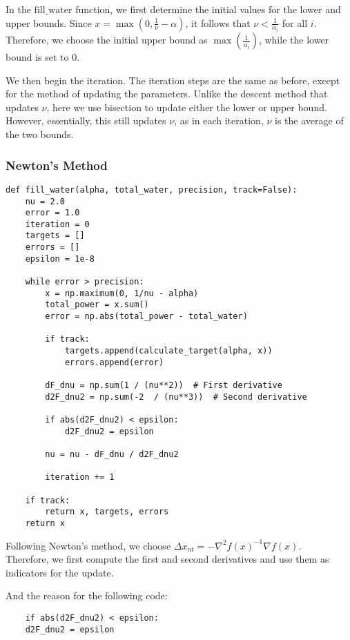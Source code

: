 \documentclass[a4paper,12pt]{article}
\begin{document}
In the \( \text{fill\_water} \) function, we first determine the initial values for the lower and upper bounds. Since \( x = \max(0, \frac{1}{\nu} - \alpha) \), it follows that \( \nu < \frac{1}{\alpha_i} \) for all \( i \). Therefore, we choose the initial upper bound as \( \max\left(\frac{1}{\alpha_i}\right) \), while the lower bound is set to 0.

We then begin the iteration. The iteration steps are the same as before, except for the method of updating the parameters. Unlike the descent method that updates \( \nu \), here we use bisection to update either the lower or upper bound. However, essentially, this still updates \( \nu \), as in each iteration, \( \nu \) is the average of the two bounds.
    \subsubsection{Newton's Method}
\begin{lstlisting}
def fill_water(alpha, total_water, precision, track=False):
    nu = 2.0
    error = 1.0
    iteration = 0
    targets = []
    errors = []
    epsilon = 1e-8
    
    while error > precision:
        x = np.maximum(0, 1/nu - alpha)
        total_power = x.sum()
        error = np.abs(total_power - total_water)
        
        if track:
            targets.append(calculate_target(alpha, x))
            errors.append(error)
        
        dF_dnu = np.sum(1 / (nu**2))  # First derivative
        d2F_dnu2 = np.sum(-2  / (nu**3))  # Second derivative

        if abs(d2F_dnu2) < epsilon:
            d2F_dnu2 = epsilon
        
        nu = nu - dF_dnu / d2F_dnu2
        
        iteration += 1
        
    if track:
        return x, targets, errors
    return x
\end{lstlisting}
\vspace*{1cm}

Following Newton's method, we choose $\Delta x_{nt} = -\nabla^2 f(x)^{-1} \nabla f(x)$. \\
Therefore, we first compute the first and second derivatives and use them as indicators for the update.

And the reason for the following code:
\begin{lstlisting}
    if abs(d2F_dnu2) < epsilon:
    d2F_dnu2 = epsilon
\end{lstlisting}
\end{document}
